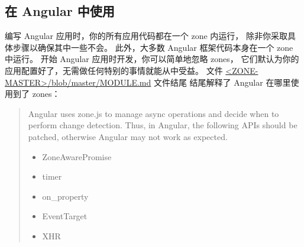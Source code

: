 \subsection{在 Angular 中使用}


编写 Angular 应用时，你的所有应用代码都在一个 zone 内运行，
除非你采取具体步骤以确保其中一些不会。
此外，大多数 Angular 框架代码本身在一个 zone 中运行。
开始 Angular 应用时开发，你可以简单地忽略 zones，
它们默认为你的应用配置好了，无需做任何特别的事情就能从中受益。
文件
\href{https://github.com/angular/zone.js/blob/master/MODULE.md}
{<ZONE-MASTER>/blob/master/MODULE.md} 文件结尾
结尾解释了 Angular 在哪里使用到了 zones：

\begin{quote}
Angular uses zone.js to manage async operations and decide when to perform
change detection. Thus, in Angular, the following APIs should be patched, otherwise
Angular may not work as expected.

\begin{itemize}
  \item ZoneAwarePromise
  \item timer
  \item on\_property
  \item EventTarget
  \item XHR
\end{itemize}
\end{quote}


